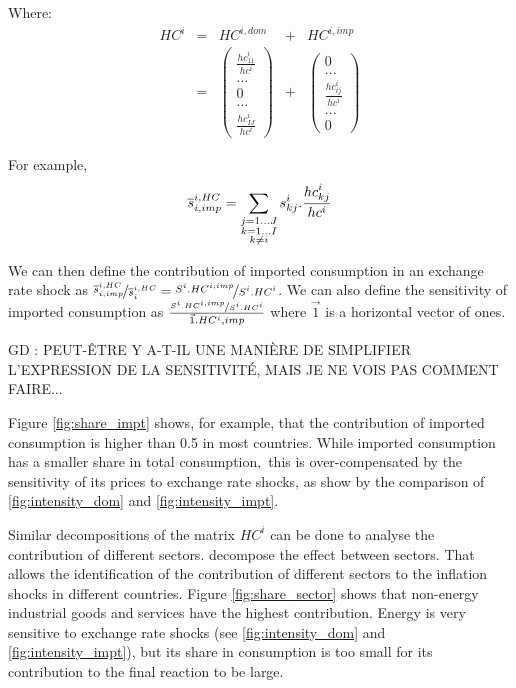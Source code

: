 \documentclass[11pt,a4paper]{article}
\begin{document}
Where:
\begin{equation}
\begin{array}{ccccc}
HC^i&=&HC^{i,dom} & + &  HC^{i,imp} \\ &=&
\left( 	\begin{array}{c} \frac{{hc}_{11}^i}{hc^i} \\	...\\0\\...\\\frac{{hc}_{IJ}^i}{hc^i}\end{array}\right) 
&+& \left( \begin{array}{c}
	0 \\
	...\\
	\frac{{hc}_{ij}^i}{hc^i}\\
	...\\
	0
	 \end{array}
	 \right)
\end{array}
\end{equation}

For example,
\begin{equation}
\overline{s}_{i,imp}^{i,HC} = \underset{\begin{subarray}{c}j=1 \dots J   \\ k=1 \dots I \\ k \neq i \end{subarray}}{\mathop \sum}\,{{s}_{kj}^i}.\frac{{hc}_{kj}^i}{hc^i}
\label{equ:share_of_imported}
 \end{equation}

We can then define the contribution of imported consumption in an exchange rate shock as $\nicefrac{\overline{s}_{i,imp}^{i,HC}}{\overline{s}_{i}^{i,HC}} = \nicefrac{S^i.HC^{i,imp}}{S^i.HC^{i}}$. We can also define the sensitivity of imported consumption as $ \frac{\nicefrac{S^i.HC^{i,imp}}{S^i.HC^{i}}}{\vec{1}.HC^i,imp}$ where $\vec 1$ is a horizontal vector of ones.

GD : PEUT-ÊTRE Y A-T-IL UNE MANIÈRE DE SIMPLIFIER L'EXPRESSION DE LA SENSITIVITÉ, MAIS JE NE VOIS PAS COMMENT FAIRE...

Figure \ref{fig:share_impt} shows, for example, that the contribution of imported consumption is higher than 0.5 in most countries. While imported consumption has a smaller share in total consumption, this is over-compensated by the sensitivity of its prices to exchange rate shocks, as show by the comparison of \ref{fig:intensity_dom} and \ref{fig:intensity_impt}.

Similar decompositions of the matrix $HC^i$ can be done to analyse the contribution of different sectors. decompose the effect between sectors. That allows the identification of the contribution of different sectors to the inflation shocks in different countries.
Figure \ref{fig:share_sector} shows that non-energy industrial goods and services have the highest contribution. Energy is very sensitive to exchange rate shocks (see \ref{fig:intensity_dom} and \ref{fig:intensity_impt}), but its share in consumption is too small for its contribution to the final reaction to be large.
\end{document}
